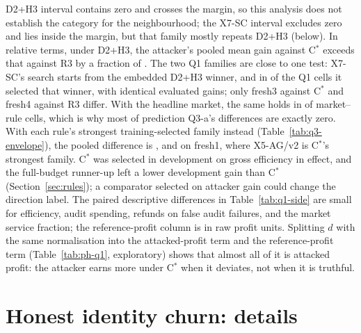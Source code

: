 \documentclass[11pt]{article}
\begin{document}
D2+H3 interval contains zero and crosses the margin, so this analysis does not establish the category for the neighbourhood; the X7-SC interval excludes zero and lies inside the margin, but that family mostly repeats D2+H3 (below). In relative terms, under D2+H3, the attacker's pooled mean gain against C$^*$ exceeds that against R3 by a fraction of . The two Q1 families are close to one test: X7-SC's search starts from the embedded D2+H3 winner, and in  of the  Q1 cells it selected that winner, with identical evaluated gains; only fresh3 against C$^*$ and fresh4 against R3 differ. With the headline market, the same holds in  of  market--rule cells, which is why most of prediction Q3-a's differences are exactly zero. With each rule's strongest training-selected family instead (Table~\ref{tab:q3-envelope}), the pooled difference is , and  on fresh1, where X5-AG/v2 is C$^*$'s strongest family. C$^*$ was selected in development on gross efficiency in effect, and the full-budget runner-up left a lower development gain than C$^*$ (Section~\ref{sec:rules}); a comparator selected on attacker gain could change the direction label. The paired descriptive differences in Table~\ref{tab:q1-side} are small for efficiency, audit spending, refunds on false audit failures, and the market service fraction; the reference-profit column is in raw profit units. Splitting $d$ with the same normalisation into the attacked-profit term and the reference-profit term (Table~\ref{tab:ph-q1}, exploratory) shows that almost all of it is attacked profit: the attacker earns more under C$^*$ when it deviates, not when it is truthful.

\FloatBarrier
\section{Honest identity churn: details}\label{sec:app-churn}
\end{document}
